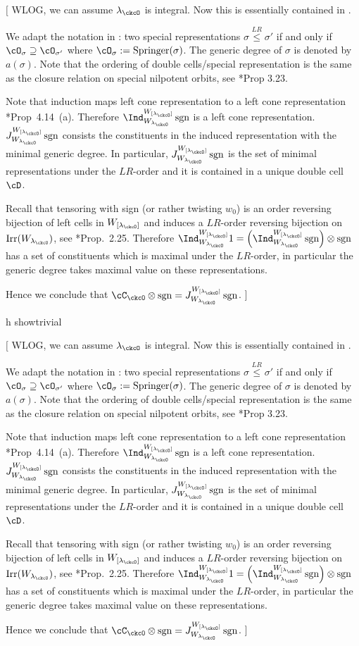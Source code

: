 \documentclass[12pt,a4paper]{amsart}
\newcommand{\trivial}[2][]{\if\relax\detokenize{#1}\relax
  {%
      \color{orange} \vspace{0em} $[$  #2 $]$
      \color{black}
  }
  \else
\ifx#1h
\ifcsname showtrivial\endcsname
{%
    \color{orange} \vspace{0em}  $[$ #2 $]$
    \color{black}
}
\fi
\else {\red Wrong argument!} \fi
\fi
}
\newcommand{\sgn}{\operatorname{sgn}}
\newcommand{\LRleq}{\stackrel{LR}{\leq}}
\numberwithin{equation}{section}
\theoremstyle{remark}
\def\Irr{\mathrm{Irr}}
\def\lamck{\lambda_\ckcO}
\def\Wlam{W_{[\lambda]}}
\def\WLamck{W_{[\lambda_{\ckcO}]}}
\def\Wlamck{W_{\lamck}}
\def\Spr{\mathrm{Springer}}
\begin{document}
\trivial{
  WLOG, we can assume $\lamck$ is integral.
  Now this is essentially contained in \cite{BVUni}.

  We adapt the notation in \cite{BVUni}: two special representations
  $\sigma \LRleq \sigma'$ if and only if $\cO_{\sigma}\supseteq \cO_{\sigma'}$
  where $\cO_{\sigma}:=\Spr(\sigma)$. The generic degree of $\sigma$ is denoted
  by $a(\sigma)$.
  Note that the ordering of double cells/special representation is the same as
  the closure relation on special nilpotent orbits, see \cite{BVUni}*{Prop
    3.23}.

  Note that induction maps left cone representation to a left cone
  representation \cite{BVUni}*{Prop~4.14~(a)}. Therefore
  $\Ind_{\Wlamck}^{\WLamck}\sgn$ is a left cone representation.
  $J_{\Wlamck}^{\WLamck}\sgn$ consists the constituents in the induced
  representation with the minimal generic degree. In particular,
  $J_{\Wlamck}^{\WLamck}\sgn$ is the set of minimal representations under the
  $LR$-order and it is contained in a unique double cell $\cD$.


  Recall that tensoring with sign (or rather twisting $w_{0}$) is an order
  reversing bijection of left cells in $\WLamck$ and induces a $LR$-order
  reversing bijection on $\Irr(\Wlamck)$, see \cite{BV2}*{Prop.~2.25}. Therefore
  $\Ind_{\Wlamck}^{\WLamck} 1 = \left(\Ind_{\Wlamck}^{\WLamck} \sgn\right)\otimes \sgn$
  has a set of constituents which is maximal under the $LR$-order, in particular
  the generic degree takes maximal value on these representations.

  Hence we conclude that $\cC_{\ckcO}\otimes \sgn = J_{\Wlamck}^{\WLamck} \sgn$.
}
\end{document}

